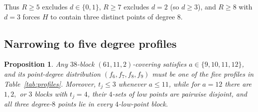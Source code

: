 \documentclass[11pt,a4paper]{article}
\newtheorem{proposition}[theorem]{Proposition}
\theoremstyle{definition}
\theoremstyle{remark}
\begin{document}
Thus $R \ge 5$ excludes $d \in \{0,1\}$, $R \ge 7$ excludes $d = 2$ (so $d \ge 3$), and $R \ge 8$ with $d = 3$ forces $H$ to contain three distinct points of degree $8$.

\subsection{Narrowing to five degree profiles}\label{sec:profiles}

\begin{proposition}\label{prop:profiles}
Any $38$-block $(61,11,2)$-covering satisfies $a \in \{9,10,11,12\}$, and its point-degree distribution $(f_6,f_7,f_8,f_9)$ must be one of the five profiles in Table~\ref{tab:profiles}. Moreover, $t_j \le 3$ whenever $a \le 11$, while for $a = 12$ there are $1, 2,$ or $3$ blocks with $t_j = 4$, their $4$-sets of low points are pairwise disjoint, and all three degree-$8$ points lie in every $4$-low-point block.
\end{proposition}
\end{document}
